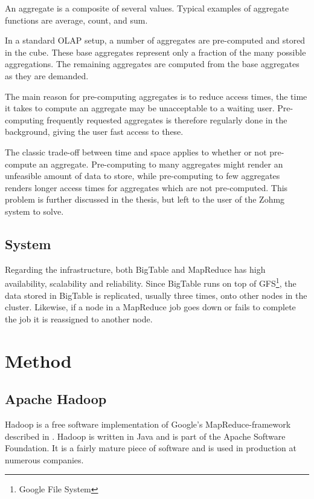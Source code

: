 \documentclass[a4paper,10pt]{book}
\begin{document}
An aggregate is a composite of several values. Typical examples of
aggregate functions are average, count, and sum.

In a standard OLAP setup, a number of aggregates are pre-computed and
stored in the cube. These base aggregates represent only a fraction of the
many possible aggregations. The remaining aggregates are computed from the
base aggregates as they are demanded.

The main reason for pre-computing aggregates is to reduce access times, the
time it takes to compute an aggregate may be unacceptable to a waiting
user. Pre-computing frequently requested aggregates is therefore regularly
done in the background, giving the user fast access to these.
\cite{olap_solutions}

The classic trade-off between time and space applies to whether or not
pre-compute an aggregate. Pre-computing to many aggregates might render an
unfeasible amount of data to store, while pre-computing to few aggregates
renders longer access times for aggregates which are not pre-computed. This
problem is further discussed in the thesis, but left to the user of the
Zohmg system to solve.


\section{System}

Regarding the infrastructure, both BigTable and MapReduce has high
availability, scalability and reliability. Since BigTable runs on top of
GFS\footnote{Google File System}, the data stored in BigTable is
replicated, usually three times, onto other nodes in the cluster.
\cite{gfs} Likewise, if a node in a MapReduce job goes down or fails to
complete the job it is reassigned to another node. \cite{mapreduce}



\chapter{Method}

\section{Apache Hadoop}

Hadoop is a free software implementation of Google's MapReduce-framework
described in \cite{mapreduce}. Hadoop is written in Java and is part of
the Apache Software Foundation.  It is a fairly mature piece of software
and is used in production at numerous companies. \cite{hadoop}
\end{document}
